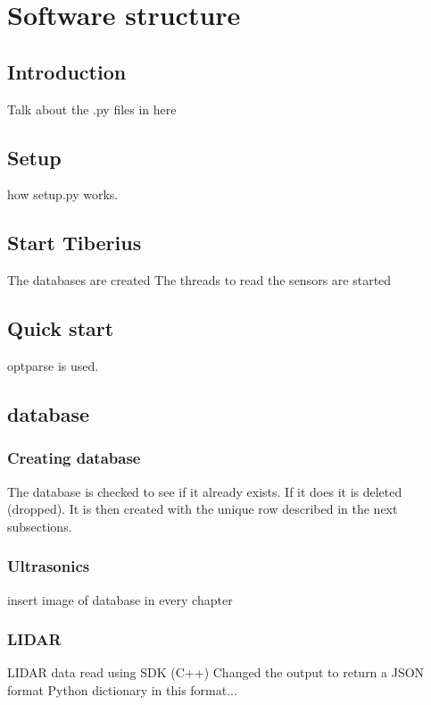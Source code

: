 \section{Software structure}
\pagestyle{aidan}

\subsection{Introduction}
Talk about the .py files in here

\subsection{Setup}
how setup.py works.

\subsection{Start Tiberius}
The databases are created
The threads to read the sensors are started

\subsection{Quick start}
optparse is used.

\subsection{database}

\subsubsection{Creating database}
The database is checked to see if it already exists. If it does it is deleted (dropped). It is then created with the unique row described in the next subsections.

\subsubsection{Ultrasonics}
insert image of database in every chapter


\subsubsection{LIDAR}
\gls{LIDAR} data read using SDK (C++)
Changed the output to return a JSON format
Python dictionary in this format...

